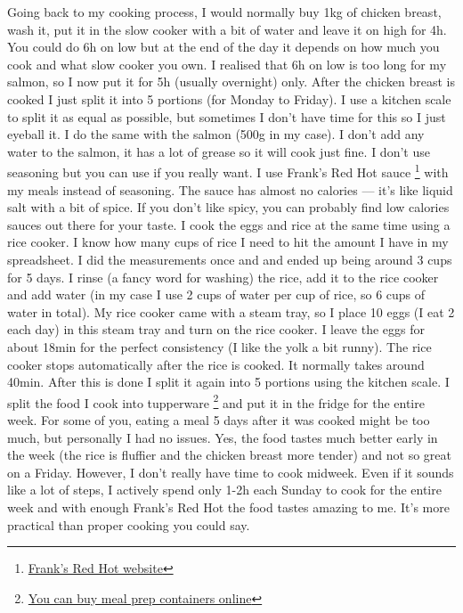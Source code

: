 \documentclass[openany, 12pt]{book}
\begin{document}
        Going back to my cooking process, I would normally buy 1kg of chicken breast, wash it, put it in the slow cooker with a bit of water and leave it on high for 4h.
        You could do 6h on low but at the end of the day it depends on how much you cook and what slow cooker you own. I realised that 6h on low is too long for my salmon,
        so I now put it for 5h (usually overnight) only. After the chicken breast is cooked I just
        split it into 5 portions (for Monday to Friday). I use a kitchen scale to split it as equal as possible, but sometimes I don't have time for this so I just eyeball it.
        I do the same with the salmon (500g in my case). I don't add any water to the salmon, it has a lot of grease so it will cook just fine. I don't use seasoning but you
        can use if you really want. I use Frank's Red Hot sauce
        \footnote{\href{https://www.franksredhot.com/}{Frank's Red Hot website}} with my meals instead of seasoning.
        The sauce has almost no calories --- it's like liquid salt with a bit of spice. If you don't like spicy, you can probably find low calories sauces out there for your
        taste. I cook the eggs and rice at the same time using a rice cooker. I know how many cups of rice I need to hit the amount I have in my spreadsheet. I did the
        measurements once and and ended up being around 3 cups for 5 days. I rinse (a fancy word for washing) the rice, add it to the rice cooker and add water (in my case I use
        2 cups of water per cup of rice, so 6 cups of water in total). My rice cooker came with a steam tray, so I place 10 eggs (I eat 2 each day) in this steam tray and turn on
        the rice cooker. I leave the eggs for about 18min for the perfect consistency (I like the yolk a bit runny). The rice cooker stops automatically after the rice is cooked.
        It normally takes around 40min. After this is done I split it again into 5 portions using the kitchen scale. I split the food I cook into tupperware
        \footnote{\href{https://igluumealprep.com/}{You can buy meal prep containers online}} and put it in the
        fridge for the entire week. For some of you, eating a meal 5 days after it was cooked might be too much, but personally I had no issues. Yes, the food tastes much better
        early in the week (the rice is fluffier and the chicken breast more tender) and not so great on a Friday. However, I don't really have time to cook midweek. Even if it
        sounds like a lot of steps, I actively spend only 1-2h each Sunday to cook for the entire week and with enough Frank's Red Hot the food tastes amazing to me. It's more
        practical than proper cooking you could say.
\end{document}
